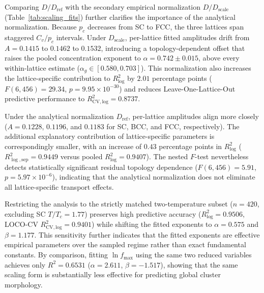 \documentclass[aps,pre,reprint,superscriptaddress,amsmath,amssymb,floatfix]{revtex4-2}
\begin{document}
Comparing $D/D_{\mathrm{ref}}$ with the secondary empirical normalization $D/D_{\mathrm{scale}}$ (Table~\ref{tab:scaling_fits}) further clarifies the importance of the analytical normalization. Because $p_c$ decreases from SC to FCC, the three lattices span staggered $C_v/p_c$ intervals. Under $D_{\mathrm{scale}}$, per-lattice fitted amplitudes drift from $A=0.1415$ to $0.1462$ to $0.1532$, introducing a topology-dependent offset that raises the pooled concentration exponent to $\alpha=0.742\pm0.015$, above every within-lattice estimate ($\alpha_g\in[0.580,0.703]$). This normalization also increases the lattice-specific contribution to $R^2_{\log}$ by $2.01$ percentage points ($F(6,456)=29.34$, $p=9.95\times10^{-30}$) and reduces Leave-One-Lattice-Out predictive performance to $R^2_{\mathrm{CV,log}}=0.8737$.

Under the analytical normalization $D_{\mathrm{ref}}$, per-lattice amplitudes align more closely ($A=0.1228$, $0.1196$, and $0.1183$ for SC, BCC, and FCC, respectively). The additional explanatory contribution of lattice-specific parameters is correspondingly smaller, with an increase of $0.43$ percentage points in $R^2_{\log}$ ($R^2_{\log,\mathrm{sep}}=0.9449$ versus pooled $R^2_{\log}=0.9407$). The nested $F$-test nevertheless detects statistically significant residual topology dependence ($F(6,456)=5.91$, $p=5.97\times10^{-6}$), indicating that the analytical normalization does not eliminate all lattice-specific transport effects.

Restricting the analysis to the strictly matched two-temperature subset ($n=420$, excluding SC $T/T_c=1.77$) preserves high predictive accuracy ($R^2_{\log}=0.9506$, LOCO-CV $R^2_{\mathrm{CV,log}}=0.9401$) while shifting the fitted exponents to $\alpha=0.575$ and $\beta=1.177$. This sensitivity further indicates that the fitted exponents are effective empirical parameters over the sampled regime rather than exact fundamental constants. By comparison, fitting $\ln f_{\max}$ using the same two reduced variables achieves only $R^2=0.6531$ ($\alpha=2.611$, $\beta=-1.517$), showing that the same scaling form is substantially less effective for predicting global cluster morphology.
\end{document}
